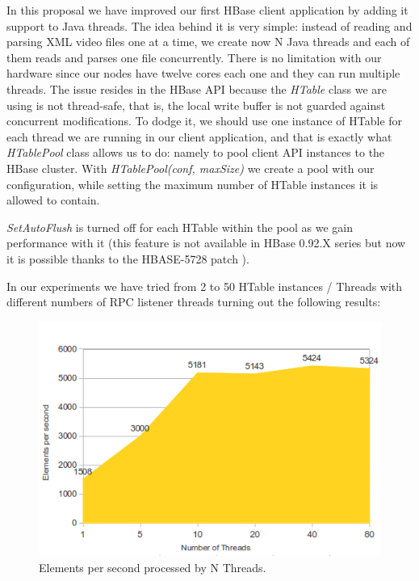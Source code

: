 In this proposal we have improved our first HBase client application by adding it support to Java threads. The idea behind it is very simple: instead of reading and parsing XML video files one at a time, we create now N Java threads and each of them reads and parses one file concurrently. There is no limitation with our hardware since our nodes have twelve cores each one and they can run multiple threads. The issue resides in the HBase API because the \textit{HTable} class we are using is not thread-safe, that is, the local write buffer is not guarded against concurrent modifications. To dodge it, we should use one instance of HTable for each thread we are running in our client application, and that is exactly what \textit{HTablePool} class allows us to do: namely to pool client API instances to the HBase cluster. With \textit{HTablePool(conf, maxSize)} we create a pool with our configuration, while setting the maximum number of HTable instances it is allowed to contain. 
\par
\textit{SetAutoFlush} is turned off for each HTable within the pool as we gain performance with it (this feature is not available in HBase 0.92.X series but now it is possible thanks to the HBASE-5728 patch \cite{HBase5728}). 
\par
 In our experiments we have tried from 2 to 50 HTable instances / Threads with different numbers of RPC listener threads turning out the following results:


\bigskip

\centerline{}


\bigskip
\begin{figure}[htb]
\centering
\includegraphics[width=1\textwidth]{./images/threadsworking.png}
\caption{Elements per second processed by N Threads.} \label{fig:threadsworking}
\end{figure}




